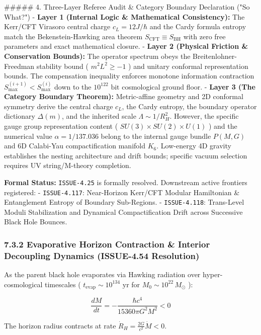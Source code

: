 \documentclass[11pt,a4paper]{article}
\theoremstyle{definition}
\theoremstyle{remark}
\begin{document}
\#\#\#\#\# 4. Three-Layer Referee Audit \& Category Boundary Declaration ("So What?")
- \textbf{Layer 1 (Internal Logic \& Mathematical Consistency):} The Kerr/CFT Virasoro central charge $c_L = 12 J/\hbar$ and the Cardy formula entropy match the Bekenstein-Hawking area theorem $S_{\text{CFT}} \equiv S_{\text{BH}}$ with zero free parameters and exact mathematical closure.
- \textbf{Layer 2 (Physical Friction \& Conservation Bounds):} The operator spectrum obeys the Breitenlohner-Freedman stability bound ( $m^2 L^2 \ge -1$ ) and unitary conformal representation bounds. The compensation inequality enforces monotone information contraction $S_{\text{max}}^{(i+1)} < S_{\text{max}}^{(i)}$ down to the $10^{122}\text{ bit}$ cosmological ground floor.
- \textbf{Layer 3 (The Category Boundary Theorem):} Metric-affine geometry and 2D conformal symmetry derive the central charge $c_L$, the Cardy entropy, the boundary operator dictionary $\Delta(m)$, and the inherited scale $\Lambda \sim 1/R_H^2$. However, the specific gauge group representation content ( $SU(3) \times SU(2) \times U(1)$ ) and the numerical value $\alpha = 1/137.036$ belong to the internal gauge bundle $P(M, G)$ and 6D Calabi-Yau compactification manifold $K_6$. Low-energy 4D gravity establishes the nesting architecture and drift bounds; specific vacuum selection requires UV string/M-theory completion.

\textbf{Formal Status:} \texttt{ISSUE-4.25} is formally resolved. Downstream active frontiers registered:
- \texttt{ISSUE-4.117}: Near-Horizon Kerr/CFT Modular Hamiltonian \& Entanglement Entropy of Boundary Sub-Regions.
- \texttt{ISSUE-4.118}: Trans-Level Moduli Stabilization and Dynamical Compactification Drift across Successive Black Hole Bounces.

\subsubsection{7.3.2 Evaporative Horizon Contraction \& Interior Decoupling Dynamics (ISSUE-4.54 Resolution)}

As the parent black hole evaporates via Hawking radiation over hyper-cosmological timescales ( $t_{\text{evap}} \sim 10^{134}\text{ yr}$ for $M_0 \sim 10^{22} \, M_\odot$ ):


\begin{equation}
\frac{dM}{dt} = -\frac{\hbar c^4}{15360 \pi G^2 M^2} < 0
\end{equation}


The horizon radius contracts at rate $\dot{R}_H = \frac{2 G}{c^2} \dot{M} < 0$.
\end{document}
